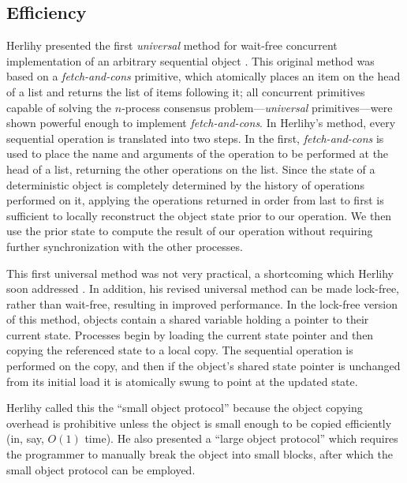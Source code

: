 \documentclass[12pt]{article}
\newcommand{\punt}[1]{}%
\newcommand{\subsecput}[2]{\subsection{#2}\label{sec:#1}}
\newcommand{\secref}[1]         {Section~\ref{sec:#1}}
\begin{document}
\subsecput{efficiency}{Efficiency}
Herlihy presented the first \emph{universal} method for wait-free
concurrent implementation of an arbitrary sequential object
\cite{Herlihy88,Herlihy91}.  This original method was based on
a \emph{fetch-and-cons} primitive, which atomically places
an item on the head of a list and returns the list of items following
it; all concurrent primitives capable of solving the
$n$-process consensus problem---\emph{universal} primitives---were
shown powerful enough to implement \emph{fetch-and-cons}.
In Herlihy's method, 
every sequential operation is translated into two steps.  In the first,
\emph{fetch-and-cons} is used to place the name and arguments of the
operation to be performed
at the head of a list, returning the other operations on the list.
Since the state
of a deterministic object is completely determined by the history of
operations performed on it, applying the operations returned
in order from last to first is sufficient to locally reconstruct the
object state 
prior to our operation.
We then use the prior state to compute the result of our operation
without requiring further synchronization with the other processes.

This first universal method was not very practical, a shortcoming
which Herlihy soon addressed \cite{Herlihy93}.  In addition, his revised universal
method can be made lock-free, rather than wait-free, resulting in
improved performance.  In the lock-free version of this method,
objects contain a shared variable
holding a pointer to their current state.  Processes begin by loading
the current state pointer and then copying the referenced state to a
local copy.  The sequential operation is performed on the
copy, and then if the object's shared state pointer is unchanged from
its initial load it is atomically swung to point at the updated state.

Herlihy called this the ``small object protocol'' because the object
copying overhead is prohibitive unless the object is small enough to
be copied efficiently (in, say, $O(1)$ time).  He also presented a
``large object protocol'' which requires the programmer to
manually break the object into small blocks, after which the small
object protocol can be employed. 
\punt{ This trouble with large objects is
common to many non-blocking implementations; our solution is presented
in \secref{proposal}.}
\end{document}
